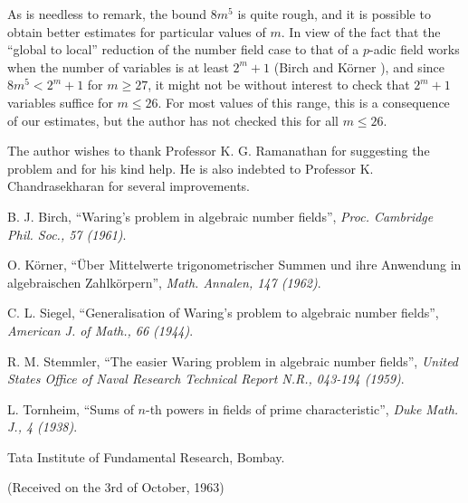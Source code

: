 \begin{remark*}
As is needless to remark, the bound $8m^5$ is quite rough, and it is possible to obtain better estimates for particular values of $m$. In view of the fact that the ``global to local'' reduction of the number field case to that of a $p$-adic field works when the number of variables is at least $2^m+1$ (Birch \cite{art5-key1} and K\"orner \cite{art5-key2}), and since $8m^5 < 2^m+1$ for $m \geq 27$, it might not be without interest to check that $2^m +1$ variables suffice for $m \leq 26$. For most values of this range, this is a consequence of our estimates, but the author has not checked this for all $m \leq 26$.
\end{remark*}

The author wishes to thank Professor K. G. Ramanathan for suggesting the problem and for his kind help. He is also indebted to Professor K. Chandrasekharan for several improvements.

\begin{thebibliography}{99}
 B. J. Birch, ``Waring's problem in algebraic number fields'', {\em Proc. Cambridge Phil. Soc., 57 (1961)}.

 O. K\"orner, ``\"Uber Mittelwerte trigonometrischer Summen und ihre Anwendung in algebraischen Zahlk\"orpern'', {\em Math. Annalen, 147 (1962)}.

 C. L. Siegel, ``Generalisation of Waring's problem to algebraic number fields'', {\em American J. of Math., 66 (1944)}.

 R. M. Stemmler, ``The easier Waring  problem in algebraic number fields'', {\em United States Office of Naval Research Technical Report N.R., 043-194 (1959)}.

 L. Tornheim, ``Sums of $n$-th powers in fields of prime characteristic'', {\em Duke Math. J., 4 (1938)}.
\end{thebibliography}

Tata Institute of Fundamental Research, Bombay. 

\vskip 0.4cm
\hfill(Received on the 3rd of October, 1963)
